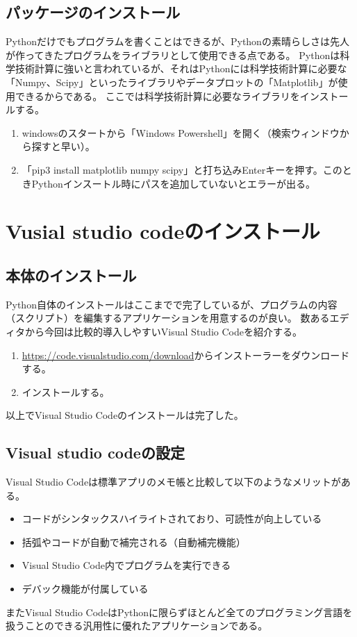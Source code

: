 \documentclass[]{ltjsbook}
\begin{document}
	\subsection{パッケージのインストール}
	Pythonだけでもプログラムを書くことはできるが、Pythonの素晴らしさは先人が作ってきたプログラムをライブラリとして使用できる点である。
	Pythonは科学技術計算に強いと言われているが、それはPythonには科学技術計算に必要な「Numpy、Scipy」といったライブラリやデータプロットの「Matplotlib」が使用できるからである。
	ここでは科学技術計算に必要なライブラリをインストールする。
	\begin{enumerate}
		\item windowsのスタートから「Windows Powershell」を開く（検索ウィンドウから探すと早い）。
		\item 「pip3 install matplotlib numpy scipy」と打ち込みEnterキーを押す。このときPythonインスートル時にパスを追加していないとエラーが出る。
	\end{enumerate}


	\section{Vusial studio codeのインストール}
	\subsection{本体のインストール}
	Python自体のインストールはここまでで完了しているが、プログラムの内容（スクリプト）を編集するアプリケーションを用意するのが良い。
	数あるエディタから今回は比較的導入しやすいVisual Studio Codeを紹介する。

	\begin{enumerate}
		\item \url{https://code.visualstudio.com/download}からインストーラーをダウンロードする。
		\item インストールする。
	\end{enumerate}
	以上でVisual Studio Codeのインストールは完了した。

	\subsection{Visual studio codeの設定}
	Visual Studio Codeは標準アプリのメモ帳と比較して以下のようなメリットがある。
	\begin{itemize}
		\item コードがシンタックスハイライトされており、可読性が向上している
		\item 括弧やコードが自動で補完される（自動補完機能）
		\item Visual Studio Code内でプログラムを実行できる
		\item デバック機能が付属している
	\end{itemize}
	またVisual Studio CodeはPythonに限らずほとんど全てのプログラミング言語を扱うことのできる汎用性に優れたアプリケーションである。
\end{document}
